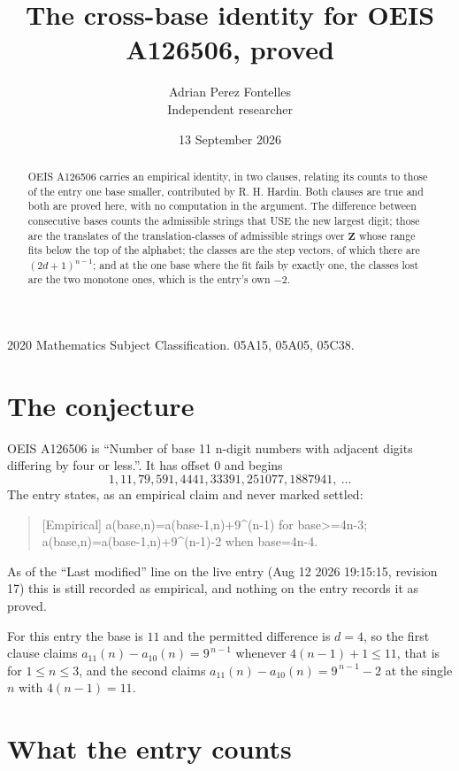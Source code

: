 \documentclass[11pt,a4paper]{article}
\title{The cross-base identity for OEIS A126506, proved}
\author{Adrian Perez Fontelles\\ \small Independent researcher}
\date{13 September 2026}
\theoremstyle{plain}
\theoremstyle{definition}
\begin{document}
\maketitle

\begin{abstract}
OEIS A126506 carries an empirical identity, in two clauses, relating its counts to those of the
entry one base smaller, contributed by R. H. Hardin. Both clauses are true and both are proved
here, with no computation in the argument. The difference between consecutive bases counts the
admissible strings that USE the new largest digit; those are the translates of the
translation-classes of admissible strings over $\mathbf{Z}$ whose range fits below the top of
the alphabet; the classes are the step vectors, of which there are $(2d+1)^{n-1}$; and at the
one base where the fit fails by exactly one, the classes lost are the two monotone ones, which
is the entry's own $-2$.
\end{abstract}

\noindent\small 2020 Mathematics Subject Classification. 05A15, 05A05, 05C38.\normalsize

\section{The conjecture}

OEIS A126506 is ``Number of base 11 n-digit numbers with adjacent digits differing by four or less.''. It has offset $0$ and begins
\[
1, 11, 79, 591, 4441, 33391, 251077, 1887941,\ \dots
\]
The entry states, as an empirical claim and never marked settled:
\begin{quote}
[Empirical] a(base,n)=a(base-1,n)+9\textasciicircum{}(n-1) for base>=4n-3; a(base,n)=a(base-1,n)+9\textasciicircum{}(n-1)-2 when base=4n-4.
\end{quote}
As of the ``Last modified'' line on the live entry (Aug 12 2026 19:15:15, revision 17)
this is still recorded as empirical, and nothing on the entry records it as proved.

For this entry the base is $11$ and the permitted difference is $d=4$, so the first clause
claims $a_{11}(n)-a_{10}(n)=9^{\,n-1}$ whenever $4(n-1)+1\le11$, that is for
$1\le n\le3$, and the second claims $a_{11}(n)-a_{10}(n)=9^{\,n-1}-2$ at the single
$n$ with $4(n-1)=11$.

\section{What the entry counts}
\end{document}
